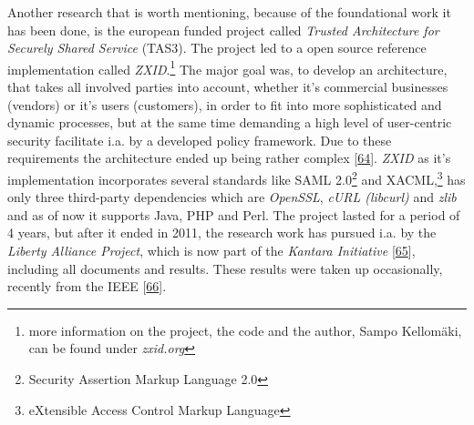 \documentclass[12pt,english,a4paper,titlepage,cleardoublepage=empty,dottedtoc]{report}
\begin{document}
Another research that is worth mentioning, because of the foundational
work it has been done, is the european funded project called
\emph{Trusted Architecture for Securely Shared Service} (TAS3). The
project led to a open source reference implementation called
\emph{ZXID}.\footnote{more information on the project, the code and the
  author, Sampo Kellomäki, can be found under \emph{zxid.org}} The major
goal was, to develop an architecture, that takes all involved parties
into account, whether it's commercial businesses (vendors) or it's users
(customers), in order to fit into more sophisticated and dynamic
processes, but at the same time demanding a high level of user-centric
security facilitate i.a. by a developed policy framework. Due to these
requirements the architecture ended up being rather complex
{[}\protect\hyperlink{ref-graphic_2011_architecture_components-of-organization-domain}{64}{]}.
\emph{ZXID} as it's implementation incorporates several standards like
SAML 2.0\footnote{Security Assertion Markup Language 2.0} and
XACML,\footnote{eXtensible Access Control Markup Language} has only
three third-party dependencies which are \emph{OpenSSL}, \emph{cURL
(libcurl)} and \emph{zlib} and as of now it supports Java, PHP and Perl.
The project lasted for a period of 4 years, but after it ended in 2011,
the research work has pursued i.a. by the \emph{Liberty Alliance
Project}, which is now part of the \emph{Kantara Initiative}
{[}\protect\hyperlink{ref-web_kantara-initiative}{65}{]}, including all
documents and results. These results were taken up occasionally,
recently from the IEEE
{[}\protect\hyperlink{ref-paper_2014_personal-data-store-approach}{66}{]}.
\end{document}
